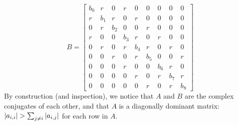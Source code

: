     \begin{equation}
        B = 
        \begin{bmatrix} 
            b_0 & r & 0 & r & 0 & 0 & 0 & 0 & 0 \\
            r & b_1 & r & 0 & r & 0 & 0 & 0 & 0 \\
            0 & r & b_2 & 0 & 0 & r & 0 & 0 & 0 \\
            r & 0 & 0 & b_3 & r & 0 & r & 0 & 0 \\
            0 & r & 0 & r & b_4 & r & 0 & r & 0 \\
            0 & 0 & r & 0 & r & b_5 & 0 & 0 & r \\
            0 & 0 & 0 & r & 0 & 0 & b_6 & r & 0 \\
            0 & 0 & 0 & 0 & r & 0 & r & b_7 & r \\
            0 & 0 & 0 & 0 & 0 & r & 0 & r & b_8
        \end{bmatrix}
    \end{equation}
By construction (and inspection), we notice that $A$ and $B$ are the complex conjugates of each other, and that $A$ is a diagonally dominant matrix: $\abs{a_{i,i}} > \sum_{j\neq i}\abs{a_{i,j}}$ for each row in $A$.